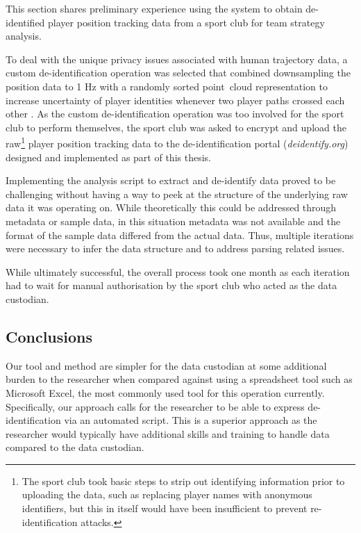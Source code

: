 This section shares preliminary experience using the system to
obtain de-identified player position tracking data from a sport club for
team strategy analysis.

To deal with the unique privacy issues associated with human trajectory
data, a custom de-identification operation was selected that combined
downsampling the position data to 1 Hz with a randomly sorted
point~cloud representation to increase uncertainty of player identities
whenever two player paths crossed each other \cite{Ding2017}. As the custom
de-identification operation was too involved for the sport club to
perform themselves, the sport club was asked to encrypt and upload the raw\footnote{The sport club took basic steps to strip out identifying information prior to uploading the data, such as replacing player names with anonymous identifiers, but this in itself would have been insufficient to prevent re-identification attacks.} player position tracking data to the de-identification portal (\textit{deidentify.org}) designed and implemented as part of this thesis.

Implementing the analysis script to extract and de-identify data proved
to be challenging without having a way to peek at the structure of the
underlying raw data it was operating on. While theoretically this could
be addressed through metadata or sample data, in this situation metadata
was not available and the format of the sample data differed from the
actual data. Thus, multiple iterations were necessary to infer the data
structure and to address parsing related issues.

While ultimately successful, the overall process took one month as each
iteration had to wait for manual authorisation by the sport club who
acted as the data custodian.

\subsection{Conclusions}

Our tool and method are simpler for the data custodian at some
additional burden to the researcher when compared against using
a spreadsheet tool such as
Microsoft Excel, the most commonly used tool for this operation
currently. Specifically, our approach calls for the researcher to be
able to express de-identification via an automated script. This
is a superior approach as the researcher would typically have additional
skills and training to handle data compared to the data custodian.

